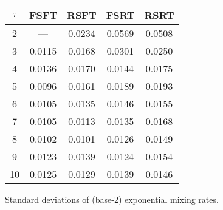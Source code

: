 \documentclass[12pt]{article}
\numberwithin{figure}{section}
\numberwithin{equation}{section}
\begin{document}






\begin{figure}[htbp]
\centering
\begin{tabular}{|c|c|c|c|c|}
	\hline
	$\tau$ & FSFT & RSFT & FSRT & RSRT \\\hline\hline
	2 & --- & 0.0234 & 0.0569 & 0.0508 \\\hline
	3 & 0.0115 & 0.0168 & 0.0301 & 0.0250 \\\hline
	4 & 0.0136 & 0.0170 & 0.0144 & 0.0175 \\\hline
	5 & 0.0096 & 0.0161 & 0.0189 & 0.0193 \\\hline
	6 & 0.0105 & 0.0135 & 0.0146 & 0.0155 \\\hline
	7 & 0.0105 & 0.0113 & 0.0135 & 0.0168 \\\hline
	8 & 0.0102 & 0.0101 & 0.0126 & 0.0149 \\\hline
	9 & 0.0123 & 0.0139 & 0.0124 & 0.0154 \\\hline
	10 & 0.0125 & 0.0129 & 0.0139 & 0.0146 \\\hline
\end{tabular}
\caption{Standard deviations of (base-2) exponential mixing rates.}
\label{stdev}
\end{figure}
\end{document}
